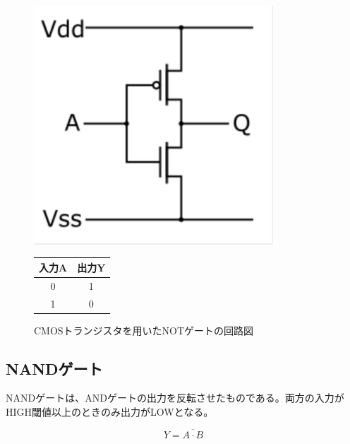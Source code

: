 \documentclass{jlreq}
\numberwithin{equation}{section}
\begin{document}
\begin{figure}[H]
  \centering
  \begin{minipage}{0.45\textwidth}
    \centering
    \includegraphics[width=0.8\textwidth]{assets/not.png}
    \caption{CMOSトランジスタを用いたNOTゲートの回路図}
    \label{fig:not_gate}
  \end{minipage}
  \hfill
  \begin{minipage}{0.45\textwidth}
    \centering
    \label{tab:not_truth_table}
    \begin{tabular}{|c|c|}
      \hline
      入力A & 出力Y \\ \hline
      0     & 1     \\ \hline
      1     & 0     \\ \hline
    \end{tabular}
  \end{minipage}
\end{figure}

\subsection{NANDゲート}
NANDゲートは、ANDゲートの出力を反転させたものである。両方の入力がHIGH閾値以上のときのみ出力がLOWとなる。

\begin{equation}
  Y = \overline{A \cdot B}
\end{equation}
\end{document}
